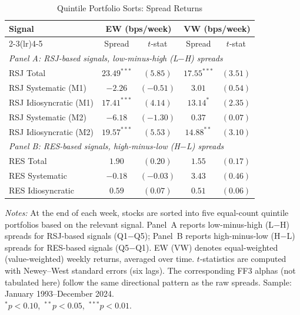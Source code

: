 \documentclass[11pt,a4paper]{article}
\begin{document}
\begin{table}[!htbp]
\centering
\caption{Quintile Portfolio Sorts: Spread Returns}
\label{tab:portfolio_spreads}
\small
\begin{threeparttable}
\begin{tabular}{l c c c c}
\toprule
Signal
  & \multicolumn{2}{c}{EW (bps/week)}
  & \multicolumn{2}{c}{VW (bps/week)} \\
\cmidrule(lr){2-3}\cmidrule(lr){4-5}
  & Spread & $t$-stat & Spread & $t$-stat \\
\midrule
\multicolumn{5}{l}{\textit{Panel A: RSJ-based signals, low-minus-high (L$-$H) spreads}} \\[3pt]
RSJ Total              & $23.49^{***}$ & $(5.85)$ & $17.55^{***}$ & $(3.51)$ \\
\quad RSJ Systematic (M1) & $-2.26$    & $(-0.51)$ & $3.01$       & $(0.54)$ \\
\quad RSJ Idiosyncratic (M1) & $17.41^{***}$ & $(4.14)$ & $13.14^{*}$ & $(2.35)$ \\
\quad RSJ Systematic (M2) & $-6.18$    & $(-1.30)$ & $0.37$       & $(0.07)$ \\
\quad RSJ Idiosyncratic (M2) & $19.57^{***}$ & $(5.53)$ & $14.88^{**}$ & $(3.10)$ \\[5pt]
\multicolumn{5}{l}{\textit{Panel B: RES-based signals, high-minus-low (H$-$L) spreads}} \\[3pt]
RES Total              & $1.90$ & $(0.20)$ & $1.55$ & $(0.17)$ \\
\quad RES Systematic   & $-0.18$ & $(-0.03)$ & $3.43$ & $(0.46)$ \\
\quad RES Idiosyncratic & $0.59$ & $(0.07)$ & $0.51$ & $(0.06)$ \\
\bottomrule
\end{tabular}
\begin{tablenotes}
\scriptsize
\item \textit{Notes:} At the end of each week, stocks are sorted into five equal-count
quintile portfolios based on the relevant signal. Panel~A reports low-minus-high (L$-$H)
spreads for RSJ-based signals (Q1$-$Q5); Panel~B reports high-minus-low (H$-$L) spreads
for RES-based signals (Q5$-$Q1). EW (VW) denotes equal-weighted (value-weighted) weekly
returns, averaged over time. $t$-statistics are computed with Newey--West standard errors
(six lags). The corresponding FF3 alphas (not tabulated here) follow the same directional
pattern as the raw spreads.
Sample: January 1993--December 2024. \\
$^{*}p<0.10$,\ $^{**}p<0.05$,\ $^{***}p<0.01$.
\end{tablenotes}
\end{threeparttable}
\end{table}
\end{document}
